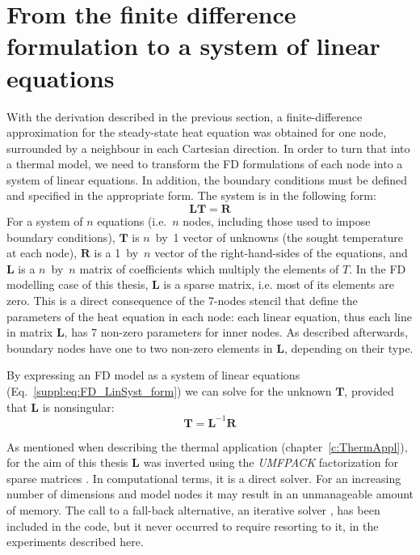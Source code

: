 \section[
    tocentry={From the FD formulation to a system of linear equations},
    head={From the FD formulation to a system of linear equations}
    ]{From the finite difference formulation to a system of linear equations}
\label{s:ThermModel:FD_LinSyst}

With the derivation described in the previous section, a finite-difference approximation for the steady-state heat equation was obtained for one node, surrounded by a neighbour in each Cartesian direction.
In order to turn that into a thermal model, we need to transform the FD formulations of each node into a system of linear equations.
In addition, the boundary conditions must be defined and specified in the appropriate form.
The system is in the following form:
\begin{equation}
    \label{suppl:eq:FD_LinSyst_form}
    \bm{L} \bm{T} = \bm{R}
\end{equation}
For a system of $n$ equations (i.e.~$n$ nodes, including those used to impose boundary conditions), $\bm{T}$ is $n$~by~\num{1} vector of unknowns (the sought temperature at each node), $\bm{R}$ is a \num{1}~by~$n$ vector of the right-hand-sides of the equations, and $\bm{L}$ is a $n$~by~$n$ matrix of coefficients which multiply the elements of $T$.
In the FD modelling case of this thesis, $\bm{L}$ is a sparse matrix, i.e. most of its elements are zero.
This is a direct consequence of the 7-nodes stencil that define the parameters of the heat equation in each node: each linear equation, thus each line in matrix $\bm{L}$, has 7 non-zero parameters for inner nodes.
As described afterwards, boundary nodes have one to two non-zero elements in $\bm{L}$, depending on their type.

By expressing an FD model as a system of linear equations (Eq.~\ref{suppl:eq:FD_LinSyst_form}) we can solve for the unknown $\bm{T}$, provided that $\bm{L}$ is nonsingular:
\begin{equation}
    \label{suppl:eq:FD_LinSyst_inversion}
    \bm{T} = \bm{L}^{-1} \bm{R}
\end{equation}

As mentioned when describing the thermal application (chapter~\ref{c:ThermAppl}), for the aim of this thesis $\bm{L}$ was inverted using the \textit{UMFPACK} factorization for sparse matrices \parencite{Davis2006}.
In computational terms, it is a direct solver.
For an increasing number of dimensions and model nodes it may result in an unmanageable amount of memory.
The call to a fall-back alternative, an iterative solver \parencite[the generalized minimal residual method, \textit{gmres}, see][]{Saad1986gmres}, has been included in the code, but it never occurred to require resorting to it, in the experiments described here.


